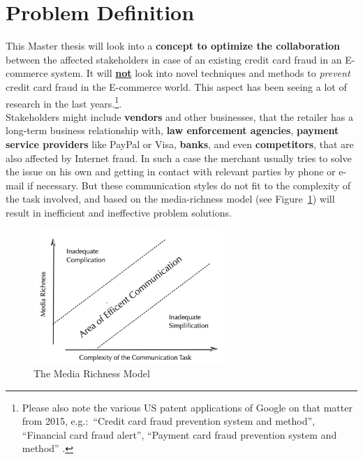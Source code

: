 
\section{Problem Definition}
\label{sec:problem_definition}

This Master thesis will look into a \textbf{concept to optimize the collaboration} between the affected stakeholders in case of an existing credit card fraud in an E-commerce system. It will \textbf{\underline{not}} look into novel techniques and methods to \textit{prevent} credit card fraud in the E-commerce world. This aspect has been seeing a lot of research in the last years.\footnote{Please also note the various US patent applications of Google on that matter from 2015, e.g.:\ “Credit card fraud prevention system and method”, “Financial card fraud alert”, “Payment card fraud prevention system and method” \citep{GooglePatents2015}.}. \\

Stakeholders might include \textbf{vendors} and other businesses, that the retailer has a long-term business relationship with, \textbf{law enforcement agencies}, \textbf{payment service providers} like PayPal or Visa, \textbf{banks}, and even \textbf{competitors}, that are also affected by  Internet fraud. In such a case the merchant usually tries to solve the issue on his own and getting in contact with relevant parties by phone or e-mail if necessary. But these communication styles do not fit to the complexity of the task involved, and based on the media-richness model (see Figure~\ref{fig:images_media_richness_model}) will result in inefficient and ineffective problem solutions. \\

\begin{figure}[!ht]
	\centering
		\includegraphics[height=2in]{images/media-richness-model.png}
	\caption{The Media Richness Model \citep{Rice1992}}
\label{fig:images_media_richness_model}
\end{figure}

